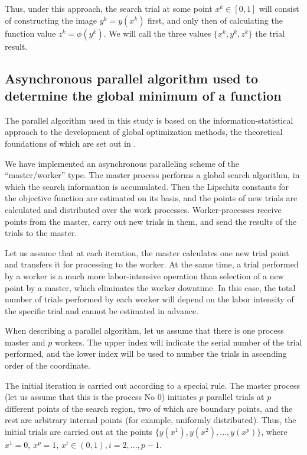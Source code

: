 \documentclass[mathematics,article,submit,pdftex,moreauthors]{Definitions/mdpi}
\begin{document}
Thus, under this approach, the search trial at some point $x^k\in[0,1]$ will consist of constructing the image $y^k=y(x^k)$ first, and only then of calculating the function value $ z^k = \phi(y^k)$.
We will call the three values $\{x^k,y ^k,z^k\}$ the trial result.

\subsection{Asynchronous parallel algorithm used to determine the global minimum of a function}

The parallel algorithm used in this study is based on the information-statistical approach to the development of global optimization methods, the theoretical foundations of which are set out in \cite{Strongin2000}. 

We have implemented an asynchronous paralleling scheme of the ``master/worker'' type. The master process performs a global search algorithm, in which the search information is accumulated. Then the Lipschitz constants for the objective function are estimated on its basis, and the points of new trials are calculated and distributed over the work processes. Worker-processes receive points from the master, carry out new trials in them, and send the results of the trials to the master. 

Let us assume that at each iteration, the master calculates one new trial  point and transfers it for processing to the worker. At the same time, a trial performed by a worker is a much more labor-intensive operation than selection of a new point by a master, which eliminates the worker downtime. 
In this case, the total number of trials performed by each worker  will depend on the labor intensity of the specific trial and cannot be estimated in advance.

When describing a parallel algorithm, let us assume that there is one process master and $p$ workers. The upper index will indicate the serial number of the trial performed, and the lower index will be used to number the trials in ascending order of the coordinate.
 
The initial iteration is carried out according to a special rule. The master process (let us assume that this is the process No 0) initiates  $p$ parallel trials at $p$ different points of the search region, two of which are boundary points, and the rest are arbitrary internal points (for example, uniformly distributed). Thus, the initial trials are carried out at the points $\{y(x^1), y(x^2), ...,y(x^p)\}$, where $x^1 = 0$, $x^p = 1$, $x^i\in(0,1), i=2,..., p-1$.
\end{document}
